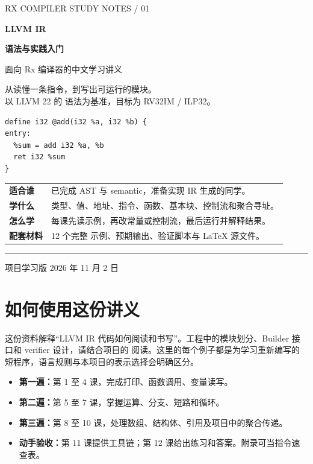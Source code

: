 \documentclass[UTF8,11pt,a4paper,fontset=none]{ctexart}
\begin{document}
\hypersetup{pageanchor=false}
\begin{titlepage}
\thispagestyle{empty}
{\sffamily\color{Teal}\large RX COMPILER \hfill STUDY NOTES / 01}
\vspace{26mm}

{\sffamily\bfseries\color{Ink}\fontsize{34}{43}\selectfont LLVM IR\par}
\vspace{3mm}
{\sffamily\bfseries\color{Ink}\fontsize{25}{34}\selectfont 语法与实践入门\par}
\vspace{9mm}
{\Large 面向 Rx 编译器的中文学习讲义\par}
\vspace{5mm}
{\color{Muted}从读懂一条指令，到写出可运行的模块。\\
以 LLVM 22 的  语法为基准，目标为 RV32IM / ILP32。}
\vspace{17mm}
\begin{lstlisting}[numbers=none,basicstyle=\ttfamily\fontsize{11}{15}\selectfont]
define i32 @add(i32 %a, i32 %b) {
entry:
  %sum = add i32 %a, %b
  ret i32 %sum
}
\end{lstlisting}
\vspace{9mm}
\begin{tabularx}{\linewidth}{@{}>{\bfseries\color{Teal}}l Y@{}}
适合谁 & 已完成 AST 与 semantic，准备实现 IR 生成的同学。\\
学什么 & 类型、值、地址、指令、函数、基本块、控制流和聚合寻址。\\
怎么学 & 每课先读示例，再改常量或控制流，最后运行并解释结果。\\
配套材料 & 12 个完整  示例、预期输出、验证脚本与 LaTeX 源文件。\\
\end{tabularx}
\vfill
{\color{Rule}\rule{\linewidth}{0.8pt}}
{\small\sffamily\color{Muted}项目学习版 \hfill 2026 年 11 月 2 日}
\end{titlepage}
\hypersetup{pageanchor=true}
\section*{如何使用这份讲义}
这份资料解释“LLVM IR 代码如何阅读和书写”。工程中的模块划分、Builder 接口和 verifier 设计，请结合项目的  阅读。这里的每个例子都是为学习重新编写的短程序，语言规则与本项目的表示选择会明确区分。

\begin{itemize}
 \item \textbf{第一遍：}第 1 至 4 课，完成打印、函数调用、变量读写。
 \item \textbf{第二遍：}第 5 至 7 课，掌握运算、分支、短路和循环。
 \item \textbf{第三遍：}第 8 至 10 课，处理数组、结构体、引用及项目中的聚合传递。
 \item \textbf{动手验收：}第 11 课提供工具链；第 12 课给出练习和答案。附录可当指令速查表。
\end{itemize}
\end{document}
